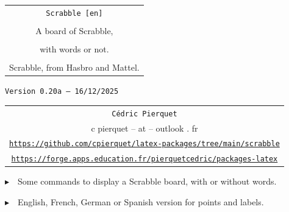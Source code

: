 \documentclass{article}
\def\TPversion{0.20a}
\def\TPdate{16/12/2025}
\begin{document}
\pagestyle{fancy}

\thispagestyle{empty}

\vspace{2cm}

\begin{center}
	\begin{minipage}{0.75\linewidth}
	\begin{tcolorbox}[colframe=yellow,colback=yellow!15]
		\begin{center}
			\begin{tabular}{c}
				{\Huge \texttt{Scrabble [en]}}\\
				\\
				{\LARGE A board of Scrabble,} \\
				\\
				{\LARGE with words or not.} \\
				\\
				{Scrabble\texttrademark{}, from Hasbro\texttrademark{} and Mattel\texttrademark{}.}
			\end{tabular}
			
			\medskip
			
			{\small \texttt{Version \TPversion{} -- \TPdate}}
		\end{center}
	\end{tcolorbox}
\end{minipage}
\end{center}

\vspace{0.5cm}

\begin{center}
	\begin{tabular}{c}
	\texttt{Cédric Pierquet}\\
	{\ttfamily c pierquet -- at -- outlook . fr}\\
	\texttt{\url{https://github.com/cpierquet/latex-packages/tree/main/scrabble}}\\
	\texttt{\url{https://forge.apps.education.fr/pierquetcedric/packages-latex}}
\end{tabular}
\end{center}

\vspace{0.5cm}

{$\blacktriangleright$~~Some commands to display a Scrabble board, with or without words.}

\smallskip

{$\blacktriangleright$~~English, French, German or Spanish version for points and labels.}
\end{document}
